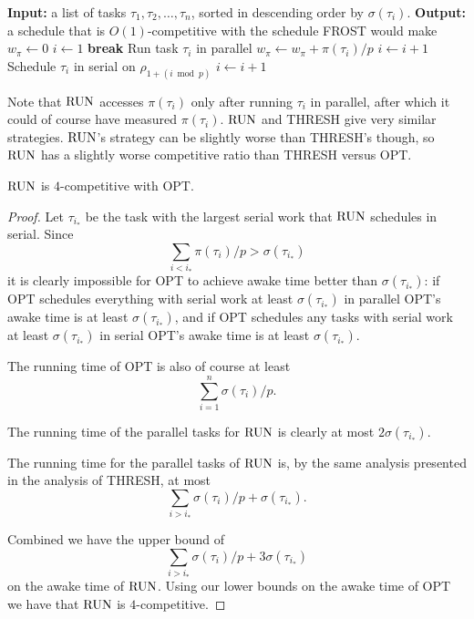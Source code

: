 \begin{algorithm}
  \caption{$\run$}
  \label{alg:run}
  \begin{algorithmic}
    \State \textbf{Input: } a list of tasks $\tau_1, \tau_2,
    \ldots, \tau_n$, sorted in descending order by
    $\sigma(\tau_i).$
    \State \textbf{Output: } a schedule that is $O(1)$-competitive
    with the schedule FROST would make
    \State 
    \State $w_\pi \gets 0$
    \State $i \gets 1$
        \State \textbf{break}
      \EndIf
      \State Run task $\tau_i$ in parallel
      \State $w_\pi \gets w_\pi + \pi(\tau_i)/p$
      \State $i \gets i+1$
    \EndWhile
      \State Schedule $\tau_i$ in serial on $\rho_{1+(i \bmod p)}$
      \State $i \gets i+1$
    \EndWhile
  \end{algorithmic}
\end{algorithm}

Note that $\run$ accesses $\pi(\tau_i)$ only after running $\tau_i$
in parallel, after which it could of course have measured
$\pi(\tau_i)$. $\run$ and THRESH give very similar strategies.
$\run$'s strategy can be slightly worse than THRESH's though, so $\run$
has a slightly worse competitive ratio than THRESH versus OPT.

\begin{proposition}
  $\run$ is $4$-competitive with OPT.
\end{proposition}
\begin{proof}
  Let $\tau_{i_*}$ be the task with the largest serial work that
  $\run$ schedules in serial.
  Since $$\sum_{i < i_*} \pi(\tau_i) / p > \sigma(\tau_{i_*})$$
  it is clearly impossible for OPT to achieve awake time better
  than $\sigma(\tau_{i_*})$: if OPT schedules everything with
  serial work at least $\sigma(\tau_{i_*})$ in parallel OPT's
  awake time is at least $\sigma(\tau_{i_*})$, and if OPT
  schedules any tasks with serial work at least
  $\sigma(\tau_{i_*})$ in serial OPT's awake time is at least
  $\sigma(\tau_{i_*})$.

  The running time of OPT is also of course at least 
  $$\sum_{i=1}^n \sigma(\tau_i)/p.$$

  The running time of the parallel tasks for $\run$ is clearly at
  most $2\sigma(\tau_{i_*})$.

  The running time for the parallel tasks of $\run$ is, by the same
  analysis presented in the analysis of THRESH, at most 
  $$\sum_{i > i_*}\sigma(\tau_i) / p + \sigma(\tau_{i_*}).$$

  Combined we have the upper bound of 
  $$\sum_{i > i_*}\sigma(\tau_i) / p + 3\sigma(\tau_{i_*})$$ 
  on the awake time of $\run$. Using our lower bounds on the awake
  time of OPT we have that $\run$ is $4$-competitive.

\end{proof}

